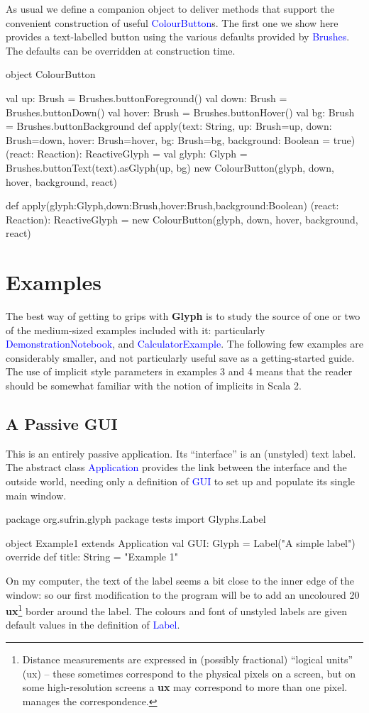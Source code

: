 \documentclass[12pt,a4paper]{article}
\def\Scala#1{\textcolor{blue}{\textsf{#1}}}
\def\S#1{\section{#1}}
\def\SS#1{\subsection{#1}}
\begin{document}
As usual we define a companion object to deliver methods
that support the convenient construction of useful \Scala{ColourButton}s.
The first one we show here provides a text-labelled button
using the various defaults provided by \Scala{Brushes}. The defaults
can be overridden at construction time.

\begin{scala}
object ColourButton {
 val up:    Brush = Brushes.buttonForeground()
 val down:  Brush = Brushes.buttonDown()
 val hover: Brush = Brushes.buttonHover()
 val bg:    Brush = Brushes.buttonBackground
 def apply(text:  String,
           up: Brush=up, down: Brush=down, hover: Brush=hover,
           bg: Brush=bg, background: Boolean = true)
          (react: Reaction): ReactiveGlyph =
 { val glyph: Glyph = Brushes.buttonText(text).asGlyph(up, bg)
   new ColourButton(glyph, down, hover, background, react)
 }

 def apply(glyph:Glyph,down:Brush,hover:Brush,background:Boolean)
          (react: Reaction): ReactiveGlyph =
     new ColourButton(glyph, down, hover, background, react)
}
\end{scala}
\clearpage
\S{Examples}

The best way of getting to grips with \textbf{Glyph} is to study
the source of one or two of the medium-sized examples included with
it: particularly \Scala{DemonstrationNotebook}, and
\Scala{CalculatorExample}. The following few examples are considerably smaller,
and not particularly useful save as a getting-started guide. The use of
implicit style parameters in examples 3 and 4 means that the reader should be
somewhat familiar with the notion of implicits in Scala 2.

\SS{A Passive GUI}

This is an entirely passive application.
Its ``interface'' is an (unstyled) text label.
The abstract class \Scala{Application} provides the link between
the interface and the outside world, needing only a definition of
\Scala{GUI} to set up and populate its single main window.

\begin{scala}
package org.sufrin.glyph
package tests
import  Glyphs.Label

object Example1 extends Application  {
  val GUI: Glyph = Label("A simple label")
  override def title: String = "Example 1"
}
\end{scala}

On my computer, the text of the label seems a bit close to the
inner edge of the window: so our first modification to the
program will be to add an uncoloured
20 \textbf{ux}\footnote{Distance measurements are
expressed in (possibly fractional) ``logical units'' (ux) -- these sometimes correspond
to the physical pixels on a screen, but on some high-resolution
screens a \textbf{ux} may correspond to more than one
pixel.  manages the correspondence.} border around the label.
The colours and font of unstyled labels are given default values in
the definition of \Scala{Label}.
\end{document}
